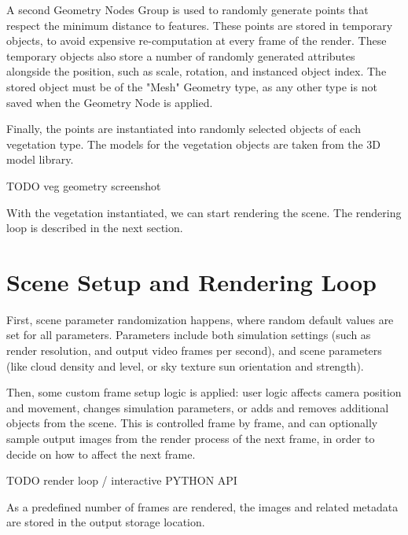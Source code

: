 A second Geometry Nodes Group is used to randomly generate points that respect the minimum distance to features. These points are stored in temporary objects, to avoid expensive re-computation at every frame of the render. These temporary objects also store a number of randomly generated attributes alongside the position, such as scale, rotation, and instanced object index. The stored object must be of the "Mesh" Geometry type, as any other type is not saved when the Geometry Node is applied.

Finally, the points are instantiated into randomly selected objects of each vegetation type. The models for the vegetation objects are taken from the 3D model library.


TODO veg geometry screenshot


With the vegetation instantiated, we can start rendering the scene. The rendering loop is described in the next section.

\section{Scene Setup and Rendering Loop}
\label{sec:rendering}


First, scene parameter randomization happens, where random default values are set for all parameters. Parameters include both simulation settings (such as render resolution, and output video frames per second), and scene parameters (like cloud density and level, or sky texture sun orientation and strength).

Then, some custom frame setup logic is applied: user logic affects camera position and movement, changes simulation parameters, or adds and removes additional objects from the scene. This is controlled frame by frame, and can optionally sample output images from the render process of the next frame, in order to decide on how to affect the next frame.

TODO render loop / interactive PYTHON API

As a predefined number of frames are rendered, the images and related metadata are stored in the output storage location.
